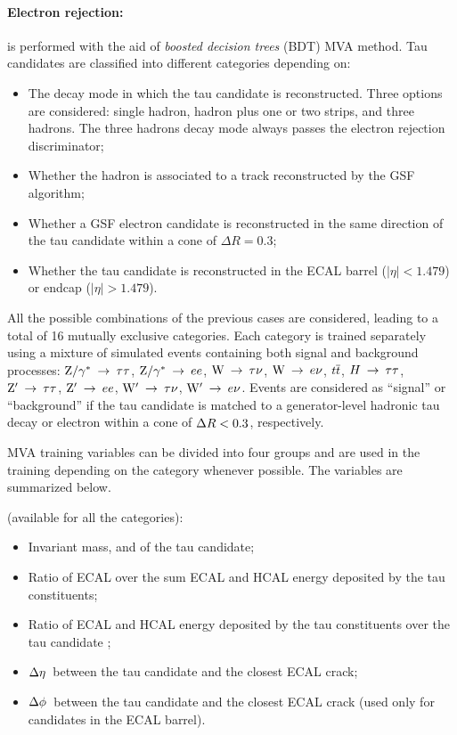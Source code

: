 \paragraph{Electron rejection:} is performed with the aid of \emph{boosted decision trees} (BDT) MVA method. Tau candidates are classified into different categories depending on:

\begin{itemize}
\item The decay mode in which the tau candidate is reconstructed. Three options are considered: single hadron, hadron plus one or two strips, and three hadrons. The three hadrons decay mode always passes the electron rejection discriminator;
\item Whether the hadron is associated to a track reconstructed by the GSF algorithm;
\item Whether a GSF electron candidate is reconstructed in the same direction of the tau candidate within a cone of $\Delta R = 0.3$;
\item Whether the tau candidate is reconstructed in the ECAL barrel ($|\eta| < 1.479$) or endcap ($|\eta| > 1.479$).
\end{itemize}

All the possible combinations of the previous cases are considered, leading to a total of 16 mutually exclusive categories. Each category is trained separately using a mixture of  simulated events containing both signal and background processes: $\mathrm{Z}/\gamma^*\:\rightarrow\:\tau\tau$, $\mathrm{Z}/\gamma^*\:\rightarrow\: ee$, $\mathrm{W}\:\rightarrow\: \tau\nu$, $\mathrm{W}\:\rightarrow\: e\nu$, $t\overline{t}$, $H\:\rightarrow\:\tau\tau$, $\mathrm{Z}'\:\rightarrow\:\tau\tau$, $\mathrm{Z}'\:\rightarrow\: ee$, $\mathrm{W}'\:\rightarrow\: \tau\nu$, $\mathrm{W}'\:\rightarrow\: e\nu$. Events are considered as ``signal'' or ``background'' if the tau candidate is matched to a generator-level hadronic tau decay or electron within a cone of $\Delta R < 0.3$, respectively. 

MVA training variables can be divided into four groups and are used in the training depending on the category whenever possible. The variables are summarized below.

 (available for all the categories):
\begin{itemize}
\item Invariant mass, \pT and \Eta of the tau candidate;
\item Ratio of ECAL over the sum ECAL and HCAL energy deposited by the tau constituents;
\item Ratio of ECAL and HCAL energy deposited by the tau constituents over the tau candidate \pT;
\item $\Delta\eta$\ between the tau candidate and the closest ECAL crack;
\item $\Delta\phi$\ between the tau candidate and the closest ECAL crack (used only for candidates in the ECAL barrel).
\end{itemize}

